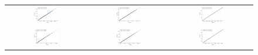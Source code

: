 \begin{figure}[hbtp]
\begin{tabular}{ccc}
		\includegraphics[width=0.33\textwidth]{Figures/PotentialStudy/Upsilon_P_CorrelationTest} &
		\includegraphics[width=0.33\textwidth]{Figures/PotentialStudy/Upsilon_E0_CorrelationTest} &
		\includegraphics[width=0.33\textwidth]{Figures/PotentialStudy/Upsilon_theta_CorrelationTest} \\		%
		\includegraphics[width=0.33\textwidth]{Figures/PotentialStudy/Gamma_P_CorrelationTest} &
		\includegraphics[width=0.33\textwidth]{Figures/PotentialStudy/Gamma_E0_CorrelationTest} &
		\includegraphics[width=0.33\textwidth]{Figures/PotentialStudy/Gamma_theta_CorrelationTest} \\		
		

\end{tabular}
\end{figure}
